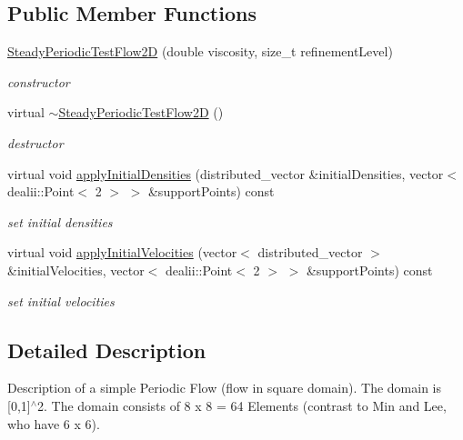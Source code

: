 \subsection*{Public Member Functions}
\begin{DoxyCompactItemize}
\item 
\hyperlink{classnatrium_1_1SteadyPeriodicTestFlow2D_a7db4598e86b34158612497ea2ff0ca74}{Steady\-Periodic\-Test\-Flow2\-D} (double viscosity, size\-\_\-t refinement\-Level)
\begin{DoxyCompactList}\small\item\em constructor \end{DoxyCompactList}\item 
\hypertarget{classnatrium_1_1SteadyPeriodicTestFlow2D_a7344b71a404f2c4bbc73c1c738fdfa22}{virtual \hyperlink{classnatrium_1_1SteadyPeriodicTestFlow2D_a7344b71a404f2c4bbc73c1c738fdfa22}{$\sim$\-Steady\-Periodic\-Test\-Flow2\-D} ()}\label{classnatrium_1_1SteadyPeriodicTestFlow2D_a7344b71a404f2c4bbc73c1c738fdfa22}

\begin{DoxyCompactList}\small\item\em destructor \end{DoxyCompactList}\item 
virtual void \hyperlink{classnatrium_1_1SteadyPeriodicTestFlow2D_ac5e25eb9649141cd239e699b6d72767c}{apply\-Initial\-Densities} (distributed\-\_\-vector \&initial\-Densities, vector$<$ dealii\-::\-Point$<$ 2 $>$ $>$ \&support\-Points) const 
\begin{DoxyCompactList}\small\item\em set initial densities \end{DoxyCompactList}\item 
virtual void \hyperlink{classnatrium_1_1SteadyPeriodicTestFlow2D_a9a196b2f52c37020cd5d00055dfbbf2a}{apply\-Initial\-Velocities} (vector$<$ distributed\-\_\-vector $>$ \&initial\-Velocities, vector$<$ dealii\-::\-Point$<$ 2 $>$ $>$ \&support\-Points) const 
\begin{DoxyCompactList}\small\item\em set initial velocities \end{DoxyCompactList}\end{DoxyCompactItemize}


\subsection{Detailed Description}
Description of a simple Periodic Flow (flow in square domain). The domain is \mbox{[}0,1\mbox{]}$^\wedge$2. The domain consists of 8 x 8 = 64 Elements (contrast to Min and Lee, who have 6 x 6). 

